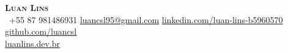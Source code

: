 \begin{center}
    \textbf{\Huge \scshape Luan Lins} \\ \vspace{5pt}
     \ \small +55 87 981486931 \quad
    \href{mailto:luancsl95@gmail.com}{ \underline{luancsl95@gmail.com}} \quad
    \href{https://www.linkedin.com/in/luan-lins-b5960570}{ \underline{linkedin.com/luan-lins-b5960570}} \quad
    \href{https://github.com/}{ \underline{github.com/luancsl}} \quad \\ \vspace{10pt} 
    \href{https://luanlins.dev.br}{ \underline{luanlins.dev.br}}
\end{center}